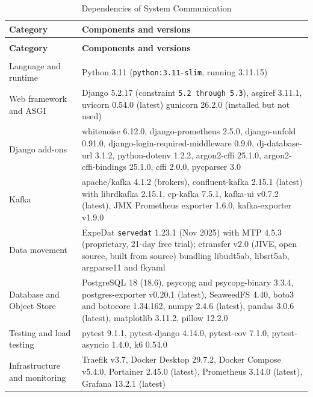 \documentclass[12pt]{article}
\begin{document}
\begin{longtable}{>{\raggedright\arraybackslash}p{} >{\raggedright\arraybackslash}p{}}
\hline
\textbf{Category} & \textbf{Components and versions} \\
\hline
\endfirsthead
\multicolumn{2}{l}{\textit{Table~\ref{tab:dependencies} continued from previous page}} \\
\hline
\textbf{Category} & \textbf{Components and versions} \\
\hline
\endhead
\hline
\endfoot
\hline
\caption{Dependencies of System Communication} \label{tab:dependencies} \\
\endlastfoot
Language and runtime & Python 3.11 (\texttt{python:3.11-slim}, running 3.11.15) \\
\hline
Web framework and ASGI & Django 5.2.17 (constraint \texttt{5.2 through 5.3}), asgiref 3.11.1, uvicorn 0.54.0 (latest) gunicorn 26.2.0 (installed but not used) \\
\hline
Django add-ons & whitenoise 6.12.0, django-prometheus 2.5.0, django-unfold 0.91.0, django-login-required-middleware 0.9.0, dj-database-url 3.1.2, python-dotenv 1.2.2, argon2-cffi 25.1.0, argon2-cffi-bindings 25.1.0, cffi 2.0.0, pycparser 3.0 \\
\hline
Kafka & apache/kafka 4.1.2 (brokers), confluent-kafka 2.15.1 (latest) with librdkafka 2.15.1, cp-kafka 7.5.1, kafka-ui v0.7.2 (latest), JMX Prometheus exporter 1.6.0, kafka-exporter v1.9.0 \\
\hline
Data movement & ExpeDat \texttt{servedat} 1.23.1 (Nov 2025) with MTP 4.5.3 (proprietary, 21-day free trial); etransfer v2.0 (JIVE, open source, built from source) bundling libudt5ab, libsrt5ab, argparse11 and fkyaml \\
\hline
Database and Object Store & PostgreSQL 18 (18.6), psycopg and psycopg-binary 3.3.4, postgres-exporter v0.20.1 (latest), SeaweedFS 4.40, boto3 and botocore 1.34.162, numpy 2.4.6 (latest), pandas 3.0.6 (latest), matplotlib 3.11.2, pillow 12.2.0 \\
\hline
Testing and load testing & pytest 9.1.1, pytest-django 4.14.0, pytest-cov 7.1.0, pytest-asyncio 1.4.0, k6 0.54.0 \\
\hline
Infrastructure and monitoring & Traefik v3.7, Docker Desktop 29.7.2, Docker Compose v5.4.0, Portainer 2.45.0 (latest), Prometheus 3.14.0 (latest), Grafana 13.2.1 (latest) \\
\end{longtable}

\end{document}
